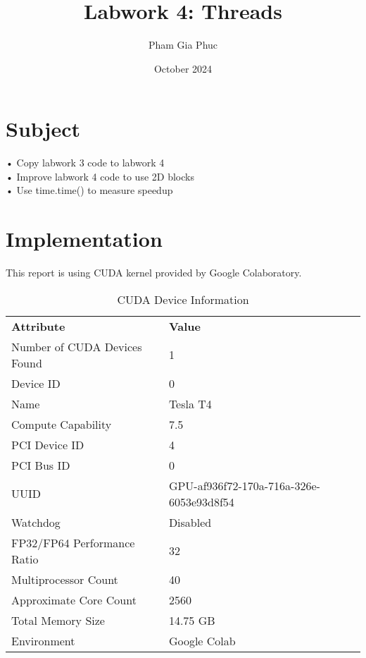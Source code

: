 \documentclass{article}
\title{Labwork 4: Threads}
\author{Pham Gia Phuc}
\date{October 2024}
\begin{document}
\maketitle

\setlength\parindent{0pt}

\section{Subject}

    • Copy labwork 3 code to labwork 4 \\
    • Improve labwork 4 code to use 2D blocks \\
    • Use time.time() to measure speedup \\
        
    
\section{Implementation}
    
    This report is using CUDA kernel provided by Google Colaboratory.
    
    \begin{table}[ht]
        \centering
        \begin{tabular}{@{}ll@{}}
            \textbf{Attribute} & \textbf{Value} \\
            Number of CUDA Devices Found & 1 \\
            Device ID & 0 \\
            Name & Tesla T4 \\
            Compute Capability & 7.5 \\
            PCI Device ID & 4 \\
            PCI Bus ID & 0 \\
            UUID & GPU-af936f72-170a-716a-326e-6053e93d8f54 \\
            Watchdog & Disabled \\
            FP32/FP64 Performance Ratio & 32 \\
            Multiprocessor Count & 40 \\
            Approximate Core Count & 2560 \\
            Total Memory Size & 14.75 GB \\
            Environment & Google Colab \\ 
        \end{tabular}
        \caption{CUDA Device Information}
        \label{tab:cuda_device_info}
    \end{table}
    
\end{document}
